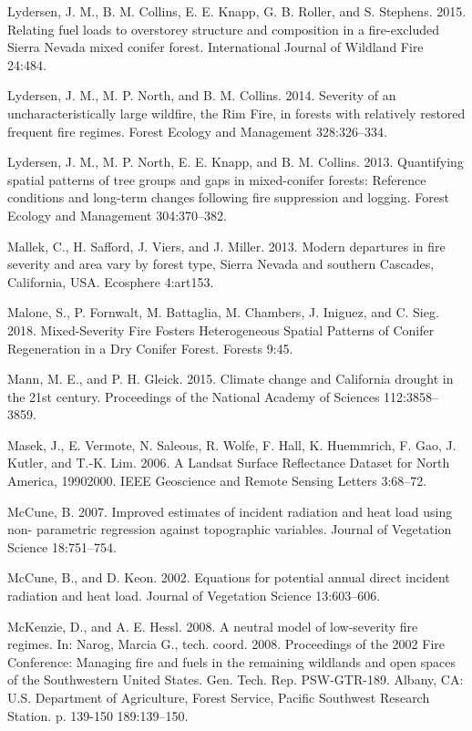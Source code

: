 \documentclass[twoside,12pt,final]{ucthesis-CA2012}
\begin{document}
\begin{ucmainmatter}
\hypertarget{ref-lydersen2015}{}
Lydersen, J. M., B. M. Collins, E. E. Knapp, G. B. Roller, and S.
Stephens. 2015. Relating fuel loads to overstorey structure and
composition in a fire-excluded Sierra Nevada mixed conifer forest.
International Journal of Wildland Fire 24:484.

\hypertarget{ref-lydersen2014}{}
Lydersen, J. M., M. P. North, and B. M. Collins. 2014. Severity of an
uncharacteristically large wildfire, the Rim Fire, in forests with
relatively restored frequent fire regimes. Forest Ecology and Management
328:326--334.

\hypertarget{ref-lydersen2013}{}
Lydersen, J. M., M. P. North, E. E. Knapp, and B. M. Collins. 2013.
Quantifying spatial patterns of tree groups and gaps in mixed-conifer
forests: Reference conditions and long-term changes following fire
suppression and logging. Forest Ecology and Management 304:370--382.

\hypertarget{ref-mallek2013}{}
Mallek, C., H. Safford, J. Viers, and J. Miller. 2013. Modern departures
in fire severity and area vary by forest type, Sierra Nevada and
southern Cascades, California, USA. Ecosphere 4:art153.

\hypertarget{ref-malone2018}{}
Malone, S., P. Fornwalt, M. Battaglia, M. Chambers, J. Iniguez, and C.
Sieg. 2018. Mixed-Severity Fire Fosters Heterogeneous Spatial Patterns
of Conifer Regeneration in a Dry Conifer Forest. Forests 9:45.

\hypertarget{ref-mann2015}{}
Mann, M. E., and P. H. Gleick. 2015. Climate change and California
drought in the 21st century. Proceedings of the National Academy of
Sciences 112:3858--3859.

\hypertarget{ref-masek2006}{}
Masek, J., E. Vermote, N. Saleous, R. Wolfe, F. Hall, K. Huemmrich, F.
Gao, J. Kutler, and T.-K. Lim. 2006. A Landsat Surface Reflectance
Dataset for North America, 19902000. IEEE Geoscience and Remote Sensing
Letters 3:68--72.

\hypertarget{ref-mccune2007}{}
McCune, B. 2007. Improved estimates of incident radiation and heat load
using non- parametric regression against topographic variables. Journal
of Vegetation Science 18:751--754.

\hypertarget{ref-mccune2002}{}
McCune, B., and D. Keon. 2002. Equations for potential annual direct
incident radiation and heat load. Journal of Vegetation Science
13:603--606.

\hypertarget{ref-mckenzie2008}{}
McKenzie, D., and A. E. Hessl. 2008. A neutral model of low-severity
fire regimes. In: Narog, Marcia G., tech. coord. 2008. Proceedings of
the 2002 Fire Conference: Managing fire and fuels in the remaining
wildlands and open spaces of the Southwestern United States. Gen. Tech.
Rep. PSW-GTR-189. Albany, CA: U.S. Department of Agriculture, Forest
Service, Pacific Southwest Research Station. p. 139-150 189:139--150.


\end{ucmainmatter}
\end{document}
